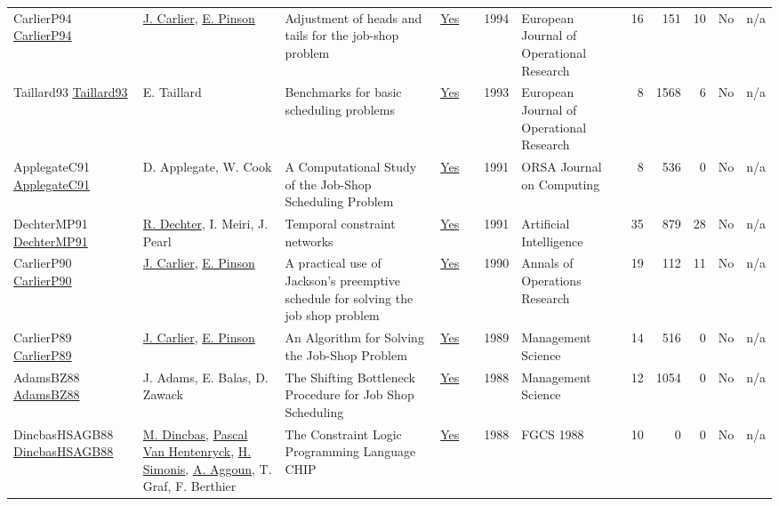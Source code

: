 {\begin{longtable}{>{\raggedright\arraybackslash}p{3cm}>{\raggedright\arraybackslash}p{6cm}>{\raggedright\arraybackslash}p{6.5cm}rrrp{2.5cm}rrrrr}
CarlierP94 \href{http://dx.doi.org/10.1016/0377-2217(94)90379-4}{CarlierP94} & \hyperref[auth:a857]{J. Carlier}, \hyperref[auth:a858]{E. Pinson} & Adjustment of heads and tails for the job-shop problem & \href{../works/CarlierP94.pdf}{Yes} & \cite{CarlierP94} & 1994 & European Journal of Operational Research & 16 & 151 & 10 & No & n/a\\
Taillard93 \href{http://dx.doi.org/10.1016/0377-2217(93)90182-m}{Taillard93} & E. Taillard & Benchmarks for basic scheduling problems & \href{../works/Taillard93.pdf}{Yes} & \cite{Taillard93} & 1993 & European Journal of Operational Research & 8 & 1568 & 6 & No & n/a\\
ApplegateC91 \href{http://dx.doi.org/10.1287/ijoc.3.2.149}{ApplegateC91} & D. Applegate, W. Cook & A Computational Study of the Job-Shop Scheduling Problem & \href{../works/ApplegateC91.pdf}{Yes} & \cite{ApplegateC91} & 1991 & ORSA Journal on Computing & 8 & 536 & 0 & No & n/a\\
DechterMP91 \href{http://dx.doi.org/10.1016/0004-3702(91)90006-6}{DechterMP91} & \hyperref[auth:a303]{R. Dechter}, I. Meiri, J. Pearl & Temporal constraint networks & \href{../works/DechterMP91.pdf}{Yes} & \cite{DechterMP91} & 1991 & Artificial Intelligence & 35 & 879 & 28 & No & n/a\\
CarlierP90 \href{http://dx.doi.org/10.1007/bf03543071}{CarlierP90} & \hyperref[auth:a857]{J. Carlier}, \hyperref[auth:a858]{E. Pinson} & A practical use of Jackson's preemptive schedule for solving the job shop problem & \href{../works/CarlierP90.pdf}{Yes} & \cite{CarlierP90} & 1990 & Annals of Operations Research & 19 & 112 & 11 & No & n/a\\
CarlierP89 \href{http://dx.doi.org/10.1287/mnsc.35.2.164}{CarlierP89} & \hyperref[auth:a857]{J. Carlier}, \hyperref[auth:a858]{E. Pinson} & An Algorithm for Solving the Job-Shop Problem & \href{../works/CarlierP89.pdf}{Yes} & \cite{CarlierP89} & 1989 & Management Science & 14 & 516 & 0 & No & n/a\\
AdamsBZ88 \href{http://dx.doi.org/10.1287/mnsc.34.3.391}{AdamsBZ88} & J. Adams, E. Balas, D. Zawack & The Shifting Bottleneck Procedure for Job Shop Scheduling & \href{../works/AdamsBZ88.pdf}{Yes} & \cite{AdamsBZ88} & 1988 & Management Science & 12 & 1054 & 0 & No & n/a\\
DincbasHSAGB88 \href{}{DincbasHSAGB88} & \hyperref[auth:a726]{M. Dincbas}, \hyperref[auth:a149]{Pascal Van Hentenryck}, \hyperref[auth:a17]{H. Simonis}, \hyperref[auth:a734]{A. Aggoun}, T. Graf, F. Berthier & The Constraint Logic Programming Language {CHIP} & \href{../works/DincbasHSAGB88.pdf}{Yes} & \cite{DincbasHSAGB88} & 1988 & FGCS 1988 & 10 & 0 & 0 & No & n/a\\

\end{longtable}}
